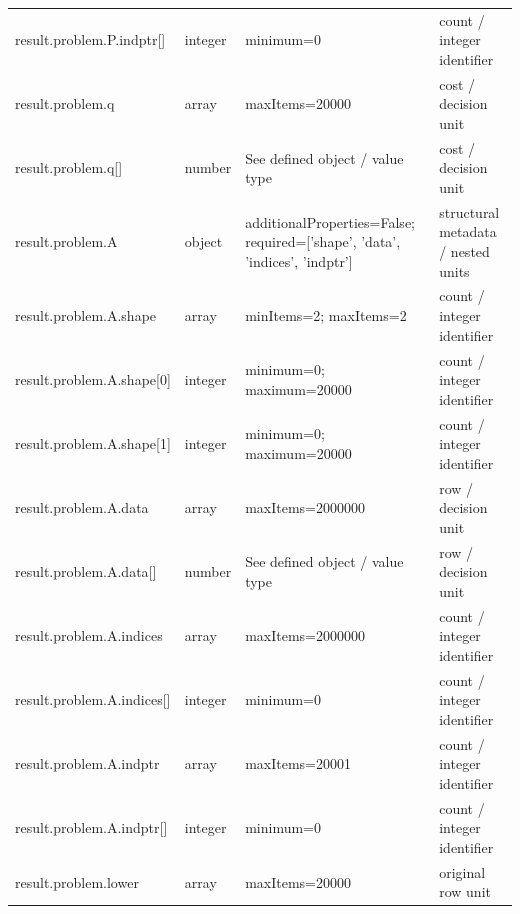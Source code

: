 \begin{longtable}{@{}>{\raggedright\arraybackslash}p{}>{\raggedright\arraybackslash}p{}>{\raggedright\arraybackslash}p{}>{\raggedright\arraybackslash}p{}@{}}
result.\allowbreak{}problem.\allowbreak{}P.\allowbreak{}indptr[] & integer & minimum=\allowbreak{}0 & count /\allowbreak{} integer identifier\\
result.\allowbreak{}problem.\allowbreak{}q & array & maxItems=\allowbreak{}20000 & cost /\allowbreak{} decision unit\\
result.\allowbreak{}problem.\allowbreak{}q[] & number & See defined object /\allowbreak{} value type & cost /\allowbreak{} decision unit\\
result.\allowbreak{}problem.\allowbreak{}A & object & additionalProperties=\allowbreak{}False; required=\allowbreak{}['shape', 'data', 'indices', 'indptr'] & structural metadata /\allowbreak{} nested units\\
result.\allowbreak{}problem.\allowbreak{}A.\allowbreak{}shape & array & minItems=\allowbreak{}2; maxItems=\allowbreak{}2 & count /\allowbreak{} integer identifier\\
result.\allowbreak{}problem.\allowbreak{}A.\allowbreak{}shape[0] & integer & minimum=\allowbreak{}0; maximum=\allowbreak{}20000 & count /\allowbreak{} integer identifier\\
result.\allowbreak{}problem.\allowbreak{}A.\allowbreak{}shape[1] & integer & minimum=\allowbreak{}0; maximum=\allowbreak{}20000 & count /\allowbreak{} integer identifier\\
result.\allowbreak{}problem.\allowbreak{}A.\allowbreak{}data & array & maxItems=\allowbreak{}2000000 & row /\allowbreak{} decision unit\\
result.\allowbreak{}problem.\allowbreak{}A.\allowbreak{}data[] & number & See defined object /\allowbreak{} value type & row /\allowbreak{} decision unit\\
result.\allowbreak{}problem.\allowbreak{}A.\allowbreak{}indices & array & maxItems=\allowbreak{}2000000 & count /\allowbreak{} integer identifier\\
result.\allowbreak{}problem.\allowbreak{}A.\allowbreak{}indices[] & integer & minimum=\allowbreak{}0 & count /\allowbreak{} integer identifier\\
result.\allowbreak{}problem.\allowbreak{}A.\allowbreak{}indptr & array & maxItems=\allowbreak{}20001 & count /\allowbreak{} integer identifier\\
result.\allowbreak{}problem.\allowbreak{}A.\allowbreak{}indptr[] & integer & minimum=\allowbreak{}0 & count /\allowbreak{} integer identifier\\
result.\allowbreak{}problem.\allowbreak{}lower & array & maxItems=\allowbreak{}20000 & original row unit\\

\end{longtable}

